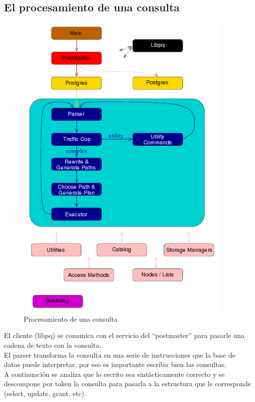 \newpage


\subsection{El procesamiento de una consulta}

\begin{figure}[ht!]
   \centering
   \includegraphics[scale=0.8]{imagenes/proceso_query.png}
   \caption{Procesamiento de una consulta \cite{Quinones}}\label{graf:proceso-consulta}
\end{figure}

El cliente (libpq) se comunica con el servicio del “postmaster” para pasarle una cadena de texto con la consulta. \\

El parser transforma la consulta en una serie de instrucciones que la base de datos puede interpretar, por eso es importante escribir bien las consultas.\\

A continuación se analiza que lo escrito sea sintácticamente correcto y se descompone por token la consulta para pasarla a la estructura que le corresponde (select, update, grant, etc).\\

